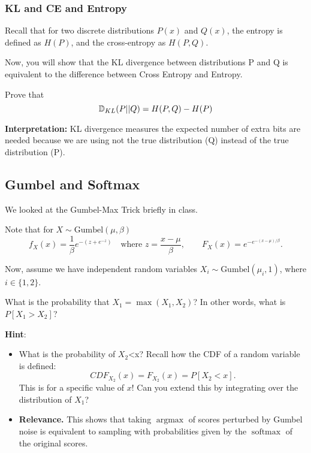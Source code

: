 \documentclass{article}
\begin{document}
\subsubsection{KL and CE and Entropy}

Recall that for two discrete distributions  $P ( x )$ and $Q ( x )$, the entropy is defined as  $H ( P )$, and the cross-entropy as $H ( P , Q )$.

Now, you will show that the KL divergence between distributions P and Q is equivalent to the difference between Cross Entropy and Entropy.

Prove that $$\mathbb{D}_{KL}(P||Q) = H(P,Q) - H(P)$$

\textbf{Interpretation:}
KL divergence measures the expected number of extra bits are needed because we are using not the true distribution (Q) instead of the true distribution (P). 



\begin{solve}
\end{solve}

\subsection{Gumbel and Softmax}

We looked at the Gumbel-Max Trick briefly in class. 

Note that for $X \sim \text{Gumbel}(\mu, \beta)$
\[
f_X(x)=\frac{1}{\beta}e^{-(z+e^{-z})} \quad \text{where } z = \frac{x - \mu}{\beta}, \qquad
F_X(x)=e^{-e^{-(x-\mu)/\beta}}.
\]

Now, assume we have independent random variables $X_i \sim \text{Gumbel}(\mu_i, 1)$, where $i\in\{1,2\}$.

What is the probability that $X_1=\max(X_1,X_2)$? In other words, what is $P[X_1>X_2]$?

\textbf{Hint}:
\begin{itemize}
    \item What is the probability of $X_2$<x?
    Recall how the CDF of a random variable is defined:
    \[
    CDF_{X_2}(x) = F_{X_2}(x) = P[X_2<x].
    \]
    This is for a specific value of $x$! Can you extend this by integrating over the distribution of $X_1$?
    
    \item \textbf{Relevance.} This shows that taking $\operatorname{argmax}$ of scores perturbed by Gumbel noise is equivalent to sampling with probabilities given by the $\operatorname{softmax}$ of the original scores.
\end{itemize}
\end{document}

